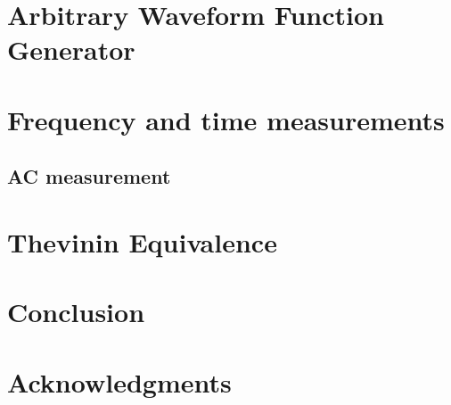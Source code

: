 \documentclass[10pt,letterpaper,oneside] {article}
\begin{document}
\section{Arbitrary Waveform Function Generator}
\section{Frequency and time measurements}
\subsection{AC measurement}\label{sec:acdc}
\section{Thevinin Equivalence}
 \section{Conclusion}
\section{Acknowledgments}


\end{document}
